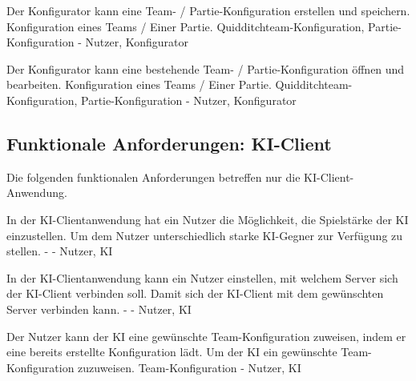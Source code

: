         {Der Konfigurator kann eine Team- / Partie-Konfiguration erstellen und speichern.}
        {Konfiguration eines Teams / Einer Partie.}
        {Quidditchteam-Konfiguration, Partie-Konfiguration}
        {-}
        {Nutzer, Konfigurator}	

        {Der Konfigurator kann eine bestehende Team- / Partie-Konfiguration öffnen und bearbeiten.}
        {Konfiguration eines Teams / Einer Partie.}
        {Quidditchteam-Konfiguration, Partie-Konfiguration}
        {-}
        {Nutzer, Konfigurator}
        
\subsection{Funktionale Anforderungen: KI-Client}

Die folgenden funktionalen Anforderungen betreffen nur die KI-Client-Anwendung.

        {In der KI-Clientanwendung hat ein Nutzer die Möglichkeit, die Spielstärke der KI einzustellen.}
        {Um dem Nutzer unterschiedlich starke KI-Gegner zur Verfügung zu stellen.}
        {-}
        {-}
        {Nutzer, KI}
        
        {In der KI-Clientanwendung kann ein Nutzer einstellen, mit welchem Server sich der KI-Client verbinden soll.}
        {Damit sich der KI-Client mit dem gewünschten Server verbinden kann.}
        {-}
        {-}
        {Nutzer, KI}

        {Der Nutzer kann der KI eine gewünschte Team-Konfiguration zuweisen, indem er eine bereits erstellte Konfiguration lädt.}
        {Um der KI ein gewünschte Team-Konfiguration zuzuweisen.}
        {Team-Konfiguration}
        {-}
        {Nutzer, KI}
